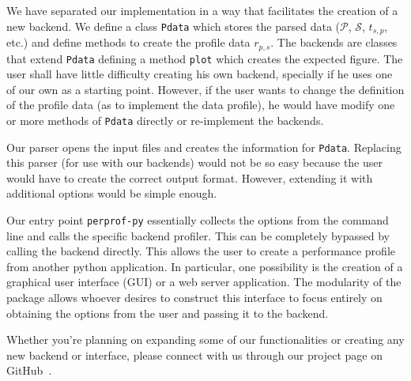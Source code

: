 We have separated our implementation in a way that facilitates the creation of a
new backend.
We define a class {\tt Pdata} which stores the parsed data ($\mathcal{P}$,
$\mathcal{S}$, $t_{s,p}$, etc.) and define methods to create the profile data
$r_{p,s}$.
The backends are classes that extend {\tt Pdata} defining a method {\tt plot}
which creates the expected figure.
The user shall have little difficulty creating his own backend, specially if he
uses one of our own as a starting point.
However, if the user wants to change the definition of the profile data (as
to implement the data profile), he would have modify
one or more methods of {\tt Pdata}
directly or re-implement the backends.

Our parser opens the input files and creates the information for {\tt Pdata}.
Replacing this parser (for use with our backends) would not be so easy
because the user would have to create the correct output format.  However,
extending it with additional options would be simple enough.

Our entry point {\tt perprof-py} essentially collects the options from the command
line and calls the specific backend profiler. This can be completely bypassed
by calling the backend directly. This allows the user to create a performance
profile from another python application. In particular, one possibility is the
creation of a graphical user interface (GUI)
or a web server application. The modularity of the package
allows whoever desires to construct this interface to focus entirely on
obtaining the options from the user and passing it to the backend.

Whether you're planning on expanding some of our functionalities or creating any
new backend or interface, please connect with us through our project page on
GitHub~\cite{url:perprof-py}.

